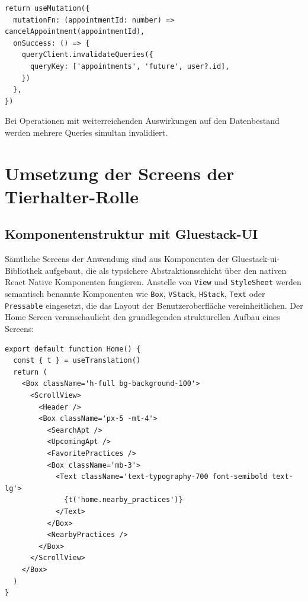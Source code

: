 \begin{listing}[H]
\begin{verbatim}
return useMutation({
  mutationFn: (appointmentId: number) => cancelAppointment(appointmentId),
  onSuccess: () => {
    queryClient.invalidateQueries({
      queryKey: ['appointments', 'future', user?.id],
    })
  },
})
\end{verbatim}
\caption{Cache-Invalidierung nach Stornierung in useCancelAppointment}
\label{lst:cancel-appointment}
\end{listing}

Bei Operationen mit weiterreichenden Auswirkungen auf den Datenbestand werden mehrere Queries simultan invalidiert.

\section{Umsetzung der Screens der Tierhalter-Rolle}

\subsection{Komponentenstruktur mit Gluestack-UI}

Sämtliche Screens der Anwendung sind aus Komponenten der Gluestack-\gls{ui}-Bibliothek aufgebaut,
die als typsichere Abstraktionsschicht über den nativen React Native Komponenten fungieren.
Anstelle von \texttt{View} und \texttt{StyleSheet} werden semantisch benannte Komponenten
wie \texttt{Box}, \texttt{VStack}, \texttt{HStack}, \texttt{Text} oder \texttt{Pressable}
eingesetzt, die das Layout der Benutzeroberfläche vereinheitlichen. Der Home Screen veranschaulicht den grundlegenden strukturellen Aufbau eines Screens:

\begin{listing}[H]
\begin{verbatim}
export default function Home() {
  const { t } = useTranslation()
  return (
    <Box className='h-full bg-background-100'>
      <ScrollView>
        <Header />
        <Box className='px-5 -mt-4'>
          <SearchApt />
          <UpcomingApt />
          <FavoritePractices />
          <Box className='mb-3'>
            <Text className='text-typography-700 font-semibold text-lg'>
              {t('home.nearby_practices')}
            </Text>
          </Box>
          <NearbyPractices />
        </Box>
      </ScrollView>
    </Box>
  )
}
\end{verbatim}
\caption{Aufbau des Home Screens}
\label{lst:home-screen}
\end{listing}

